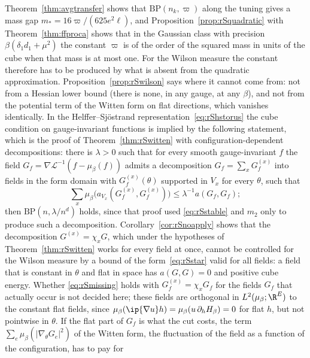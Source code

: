\begin{remark}\label{rem:rSmissing}
Theorem~\ref{thm:avgtransfer} shows that $\mathrm{BP}(n_k,\varpi)$ along the
tuning gives a mass gap $m_*=16\varpi/(625e^2\ell)$, and
Proposition~\ref{prop:rSquadratic} with Theorem~\ref{thm:ffproca} shows that
in the Gaussian class with precision $\beta(\delta_1d_1+\mu^2)$ the constant
$\varpi$ is of the order of the squared mass in units of the cube when that
mass is at most one. For the Wilson measure the constant therefore has to be
produced by what is absent from the quadratic approximation.
Proposition~\ref{prop:rSwilson} says where it cannot come from: not from a
Hessian lower bound (there is none, in any gauge, at any $\beta$), and not
from the potential term of the Witten form on flat directions, which vanishes
identically. In the Helffer--Sj\"ostrand representation~\eqref{eq:rShstorus}
the cube condition on gauge-invariant functions is implied by the following
statement, which is the proof of Theorem~\ref{thm:rSwitten} with
configuration-dependent decompositions: there is $\lambda>0$ such that for
every smooth gauge-invariant $f$ the field $G_f=\nabla\mathcal L^{-1}(f-
\mu_\beta(f))$ admits a decomposition $G_f=\sum_xG_f^{(x)}$ into fields in
the form domain with $G_f^{(x)}(\theta)$ supported in $V_x$ for every
$\theta$, such that
\begin{equation}\label{eq:rSmissing}
\sum_x\mu_\beta\bigl(a_{V_x}(G_f^{(x)},G_f^{(x)})\bigr)\le\lambda^{-1}a(G_f,
G_f);
\end{equation}
then $\mathrm{BP}(n,\lambda/n^d)$ holds, since that proof used
\eqref{eq:rSstable} and $m_2$ only to produce such a decomposition.
Corollary~\ref{cor:rSnoapply} shows that the decomposition $G^{(x)}=\chi_xG$,
which under the hypotheses of Theorem~\ref{thm:rSwitten} works for every
field at once, cannot be controlled for the Wilson measure by a bound of the
form~\eqref{eq:rSstar} valid for all fields: a field that is constant in
$\theta$ and flat in space has $a(G,G)=0$ and positive cube energy. Whether
\eqref{eq:rSmissing} holds with $G^{(x)}_f=\chi_xG_f$ for the fields $G_f$
that actually occur is not decided here; these fields are orthogonal in
$L^2(\mu_\beta;\R^E)$ to the constant flat fields, since $\mu_\beta(\ip{\nabla
u}h)=\mu_\beta(u\,\partial_hH_\beta)=0$ for flat $h$, but not pointwise in
$\theta$. If the flat part of $G_f$ is what the cut costs, the term $\sum_e
\mu_\beta(\lvert\nabla_\theta G_e\rvert^2)$ of the Witten form, the
fluctuation of the field as a function of the configuration, has to pay for

\end{remark}
